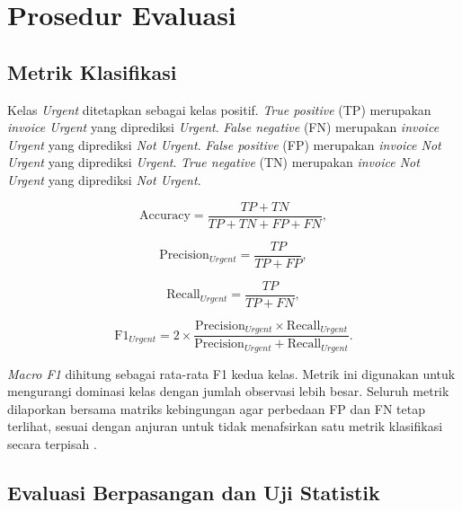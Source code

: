 \FloatBarrier

\section{Prosedur Evaluasi}

\subsection{Metrik Klasifikasi}

Kelas \textit{Urgent} ditetapkan sebagai kelas positif. \textit{True positive} (TP) merupakan \textit{invoice Urgent} yang diprediksi \textit{Urgent}. \textit{False negative} (FN) merupakan \textit{invoice Urgent} yang diprediksi \textit{Not Urgent}. \textit{False positive} (FP) merupakan \textit{invoice Not Urgent} yang diprediksi \textit{Urgent}. \textit{True negative} (TN) merupakan \textit{invoice Not Urgent} yang diprediksi \textit{Not Urgent}.

\begin{equation}
\mathrm{Accuracy}=\frac{TP+TN}{TP+TN+FP+FN},
\label{eq:accuracy-komparatif}
\end{equation}

\begin{equation}
\mathrm{Precision}_{Urgent}=\frac{TP}{TP+FP},
\label{eq:precision-komparatif}
\end{equation}

\begin{equation}
\mathrm{Recall}_{Urgent}=\frac{TP}{TP+FN},
\label{eq:recall-komparatif}
\end{equation}

\begin{equation}
\mathrm{F1}_{Urgent}=2\times\frac{\mathrm{Precision}_{Urgent}\times\mathrm{Recall}_{Urgent}}{\mathrm{Precision}_{Urgent}+\mathrm{Recall}_{Urgent}}.
\label{eq:f1-komparatif}
\end{equation}

\textit{Macro F1} dihitung sebagai rata-rata F1 kedua kelas. Metrik ini digunakan untuk mengurangi dominasi kelas dengan jumlah observasi lebih besar. Seluruh metrik dilaporkan bersama matriks kebingungan agar perbedaan FP dan FN tetap terlihat, sesuai dengan anjuran untuk tidak menafsirkan satu metrik klasifikasi secara terpisah \cite{RainioEtAl2024}.

\subsection{Evaluasi Berpasangan dan Uji Statistik}

